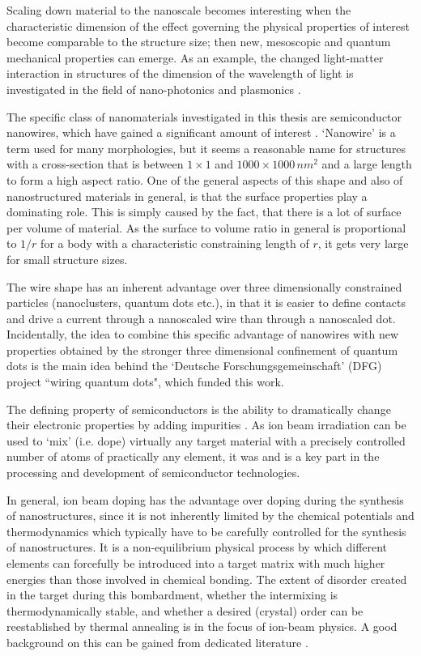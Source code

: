 Scaling down material to the nanoscale becomes interesting when the characteristic dimension of the effect governing the physical properties of interest become comparable to the structure size; then new, mesoscopic and quantum mechanical properties can emerge. As an example, the changed light-matter interaction in structures of the dimension of the wavelength of light is investigated in the field of nano-photonics and plasmonics \cite{saleh_fundamentals_2007,maier_plasmonics:_2007}.

The specific class of nanomaterials investigated in this thesis are semiconductor nanowires, which have gained a significant amount of  interest \cite{huang_room-temperature_2001,cui_nanowire_2001,duan_indium_2001,xia_one-dimensional_2003,lieber_functional_2007}. `Nanowire' is a term used for many morphologies, but it seems a reasonable name for structures with a cross-section that is between $1 \times 1$ and $1000 \times 1000\,nm^2$ and a large length to form a high aspect ratio. One of the general aspects of this shape and also of nanostructured materials in general, is that the surface properties play a dominating role. This is simply caused by the fact, that there is a lot of surface per volume of material. As the surface to volume ratio in general is proportional to $1/r$ for a body with a characteristic constraining length of $r$, it gets very large for small structure sizes.

The wire shape has an inherent advantage over three dimensionally constrained particles (nanoclusters, quantum dots etc.), in that it is easier to define contacts and drive a current through a nanoscaled wire than through a nanoscaled dot. Incidentally, the idea to combine this specific advantage of nanowires with new properties obtained by the stronger three dimensional confinement of quantum dots is the main idea behind the `Deutsche Forschungsgemeinschaft' (DFG) project ``wiring quantum dots", which funded this work. 

The defining property of semiconductors is the ability to dramatically change their electronic properties by adding impurities \cite{sze_physics_2006}. As ion beam irradiation can be used to `mix' (i.e. dope) virtually any target material with a precisely controlled number of atoms of practically any element, it was and is a key part in the processing and development of semiconductor technologies. 

In general, ion beam doping has the advantage over doping during the synthesis of nanostructures, since it is not inherently limited by the chemical potentials and thermodynamics which typically have to be carefully controlled for the synthesis of nanostructures. It is a non-equilibrium physical process by which different elements can forcefully be introduced into a target matrix with much higher energies than those involved in chemical bonding. The extent of disorder created in the target during this bombardment, whether the intermixing is thermodynamically stable, and whether a desired (crystal) order can be reestablished by thermal annealing is in the focus of ion-beam physics. A good background on this can be gained from dedicated literature \cite{ziegler_stopping_1985,eckstein_computer_1991,nastasi/mayer/hirvonen_ion-solid_2008,schmidt_ion_2012}.

